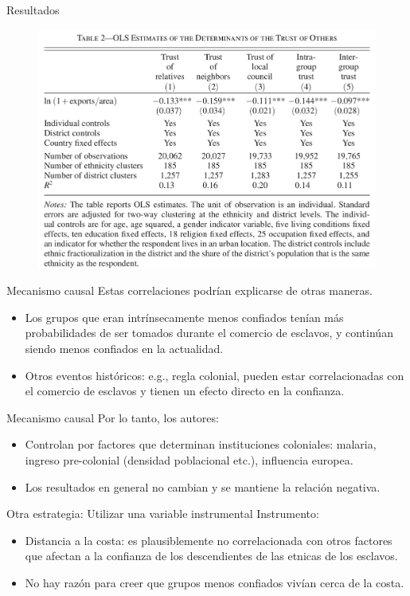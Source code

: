 \documentclass[11pt, aspectratio=169, compress]{beamer}
\begin{document}
\begin{frame}{Resultados}
	\begin{figure}[htb]
		\centering
		\includegraphics[width=.7\textwidth]{tab2}
	\end{figure}
\end{frame}
\begin{frame}{Mecanismo causal}
Estas correlaciones podrían explicarse de otras maneras.
\begin{itemize}
	\item Los grupos que eran intrínsecamente menos confiados tenían más probabilidades de ser tomados durante el comercio de esclavos, y continúan siendo menos confiados en la actualidad.
	\item Otros eventos históricos: e.g., regla colonial, pueden estar correlacionadas con el comercio de esclavos y tienen un efecto directo en la confianza. 
\end{itemize}
\end{frame}
\begin{frame}{Mecanismo causal}
	Por lo tanto, los autores: 
	\begin{itemize}
		\item Controlan por factores que determinan instituciones coloniales: malaria, ingreso pre-colonial (densidad poblacional etc.), influencia europea. 
		\item Los resultados en general no cambian y se mantiene la relación negativa. 
	\end{itemize}
\end{frame}
\begin{frame}{Otra estrategia: Utilizar una variable instrumental}
Instrumento: 
\begin{itemize}
	\item Distancia a la costa: es plausiblemente no correlacionada con otros factores que afectan a la confianza de los descendientes de las etnicas de los esclavos. 
	\item No hay razón para creer que grupos menos confiados vivían cerca de la costa. 
\end{itemize}
\end{frame}
\end{document}
